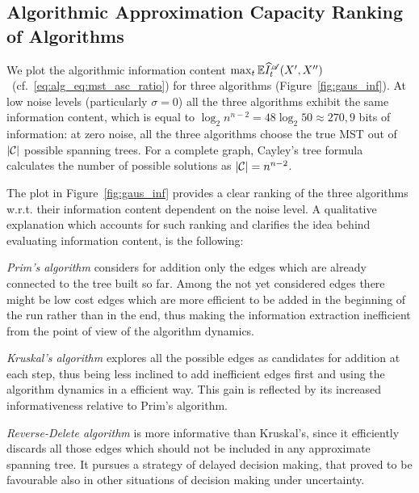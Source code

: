 \subsection{Algorithmic Approximation Capacity Ranking of Algorithms}
We plot the algorithmic information content $\max_t \mathbb{E} \widehat
I_t^{\mathscr{A}}(X', X'') $~(cf.~\eqref{eq:alg_eq:mst_asc_ratio}) for three algorithms (Figure~\ref{fig:gaus_inf}).
At low noise levels (particularly $\sigma = 0$) all the three
algorithms exhibit the same information content, which is equal to
$\log_2{n^{n-2}} = 48 \log_2{50} \approx 270,9$ bits of information:
at zero noise, all the three algorithms choose the true MST out of
$|{\cal C}|$ possible spanning trees. For a complete graph,
Cayley's tree formula calculates the number of possible solutions as
$|{\cal C}| = n^{n-2}$.

The plot in Figure~\ref{fig:gaus_inf} provides a clear ranking of the three algorithms
w.r.t. their information content dependent on the noise level. A qualitative explanation 
which accounts for such ranking and 
clarifies the idea behind evaluating information content, is the
following:
%

\emph{Prim's algorithm} considers for addition only the edges which
are already connected to the tree built so far.  Among the not yet
considered edges there might be low cost edges which are more
efficient to be added in the beginning of the run rather than in the
end, thus making the information extraction inefficient from the point
of view of the algorithm dynamics.

\emph{Kruskal's algorithm} explores all the possible edges as
candidates for addition at each step, thus being less inclined to add
inefficient edges first and using the algorithm dynamics in a
efficient way. This gain is reflected by its increased informativeness
relative to Prim's algorithm.

\emph{Reverse-Delete algorithm} is more informative than Kruskal's,
since it efficiently discards all those edges which should not be
included in any approximate spanning tree. It pursues a strategy of
delayed decision making, that proved to be favourable also in other
situations of decision making under uncertainty.

